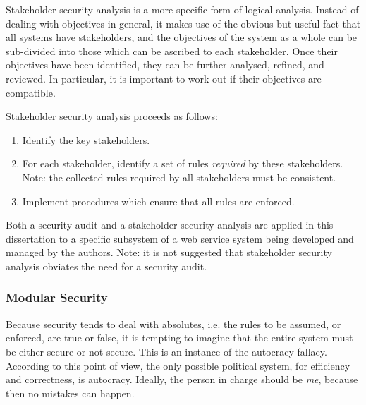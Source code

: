Stakeholder security analysis is a more specific form of logical analysis. Instead of dealing with
objectives in general, it makes use of the obvious but useful fact that all systems have
stakeholders, and the objectives of the system as a whole can be sub-divided into those
which can be ascribed to each stakeholder. Once their objectives have been identified, they
can be further analysed, refined, and reviewed. In particular, it is important to work out if
their objectives are compatible.

\iffalse
Stakeholder security analysis proceeds as follows: 
\begin{enumerate}[1.]
\item Identify the key stakeholders.
\item For each stakeholder, identify a set of rules {\em required}
by these stakeholders. Note: the collected rules required
by all stakeholders must be consistent.
\item Implement procedures which ensure that all rules are enforced.
\end{enumerate}

Both a security audit and a stakeholder security analysis
are applied in this dissertation to a specific subsystem of a web
service system being developed and managed by the authors.
Note: it is not suggested that stakeholder security analysis obviates
the need for a security audit.



\subsubsection{Modular Security}

Because security tends to deal with absolutes, i.e. the rules to be assumed, or enforced, are true or false, it is tempting to imagine that the entire system must be either secure or not secure. This is an instance of the autocracy fallacy. According to this point of view, the only possible political system, for efficiency and correctness, is autocracy. Ideally, the person in charge should be {\em me}, because then no mistakes can happen.

